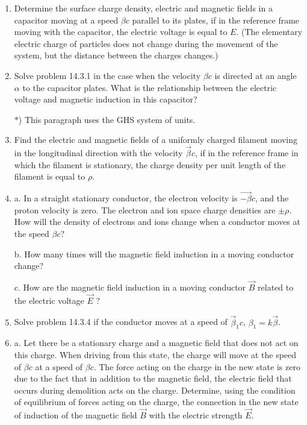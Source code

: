 \documentclass{article}
\begin{document}
\begin{enumerate}[label=14.3.\arabic*]


\item Determine the surface charge density, electric and magnetic fields in a capacitor moving at a speed $\beta c$ parallel to its plates, if in the reference frame moving with the capacitor, the electric voltage is equal to $E$. (The elementary electric charge of particles does not change during the movement of the system, but the distance between the charges changes.)

\item Solve problem 14.3.1 in the case when the velocity $\beta c$ is directed at an angle $\alpha$ to the capacitor plates. What is the relationship between the electric voltage and magnetic induction in this capacitor? 

$\ast$) This paragraph uses the GHS system of units.

\item Find the electric and magnetic fields of a uniformly charged filament moving in the longitudinal direction with the velocity $\overrightarrow{\beta} c$, if in the reference frame in which the filament is stationary, the charge density per unit length of the filament is equal to $\rho$.

\item a. In a straight stationary conductor, the electron velocity is $\overrightarrow{-\beta} c$, and the proton velocity is zero. The electron and ion space charge densities are $\pm \rho$. How will the density of electrons and ions change when a conductor moves at the speed $\beta c$? 

b. How many times will the magnetic field induction in a moving conductor change?

c. How are the magnetic field induction in a moving conductor $\overrightarrow{B}$ related to the electric voltage $\overrightarrow{E}$ ?

\item Solve problem 14.3.4 if the conductor moves at a speed of $\overrightarrow{\beta}_1 c$, $\beta_1 = k \overrightarrow{\beta}$.

\item a. Let there be a stationary charge and a magnetic field that does not act on this charge. When driving from this state, the charge will move at the speed of $\beta c$ at a speed of $\beta c$. The force acting on the charge in the new state is zero due to the fact that in addition to the magnetic field, the electric field that occurs during demolition acts on the charge. Determine, using the condition of equilibrium of forces acting on the charge, the connection in the new state of induction of the magnetic field $\overrightarrow{B}$ with the electric strength $\overrightarrow{E}$. 


\end{enumerate}
\end{document}
